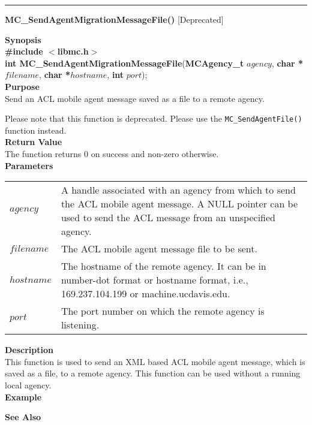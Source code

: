 \noindent
\vspace{5pt}
\rule{6.5in}{.01in}
\noindent
{\LARGE \bf MC\_SendAgentMigrationMessageFile()} [Deprecated]\\ 
{}
\label{api:MC_SendAgentMigrationMessageFile()}

\noindent
{\bf Synopsis}\\
{\bf \#include $<$libmc.h$>$}\\
{\bf int MC\_SendAgentMigrationMessageFile}({\bf MCAgency\_t} $agency$, {\bf char *}$filename$, {\bf char *}$hostname$, {\bf int} $port$);\\

\noindent
{\bf Purpose}\\
Send an ACL mobile agent message saved as a file to a remote agency.

Please note that this function is deprecated. Please use the
\texttt{MC\_SendAgentFile()} function instead.\\

\noindent
{\bf Return Value}\\
The function returns 0 on success and non-zero otherwise.\\

\noindent
{\bf Parameters}
\vspace{-0.1in}
\begin{description}
\item
\begin{tabular}{p{20 mm}p{135 mm}}
$agency$ & A handle associated with an agency from which to send the ACL 
mobile agent message. A NULL pointer can be used to send the ACL message 
from an unspecified agency.\\ 
$filename$ & The ACL mobile agent message file to be sent.\\
$hostname$ & The hostname of the remote agency. It can be in number-dot 
format or hostname format, i.e., 169.237.104.199 or machine.ucdavis.edu.\\
$port$ & The port number on which the remote agency is listening. 
\end{tabular}
\end{description}

\noindent
{\bf Description}\\
This function is used to send an XML based ACL mobile agent message, which 
is saved as a file, to a remote agency. 
This function can be used without a running local agency.\\

\noindent
{\bf Example}\\
\noindent
{\footnotesize}

\noindent
{\bf See Also}\\

